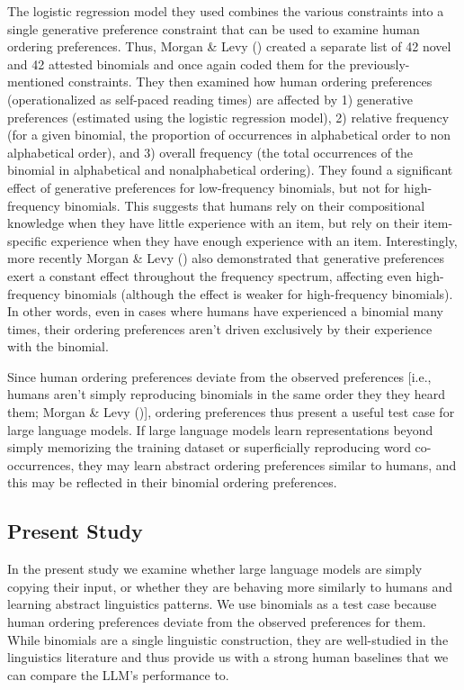 \documentclass[
  12pt,
  letterpaper,
]{scrreprt}
\begin{document}
The logistic regression model they used combines the various constraints
into a single generative preference constraint that can be used to
examine human ordering preferences. Thus, Morgan \& Levy
() created a
separate list of 42 novel and 42 attested binomials and once again coded
them for the previously-mentioned constraints. They then examined how
human ordering preferences (operationalized as self-paced reading times)
are affected by 1) generative preferences (estimated using the logistic
regression model), 2) relative frequency (for a given binomial, the
proportion of occurrences in alphabetical order to non alphabetical
order), and 3) overall frequency (the total occurrences of the binomial
in alphabetical and nonalphabetical ordering). They found a significant
effect of generative preferences for low-frequency binomials, but not
for high-frequency binomials. This suggests that humans rely on their
compositional knowledge when they have little experience with an item,
but rely on their item-specific experience when they have enough
experience with an item. Interestingly, more recently Morgan \& Levy
() also demonstrated that generative
preferences exert a constant effect throughout the frequency spectrum,
affecting even high-frequency binomials (although the effect is weaker
for high-frequency binomials). In other words, even in cases where
humans have experienced a binomial many times, their ordering
preferences aren't driven exclusively by their experience with the
binomial.

Since human ordering preferences deviate from the observed preferences
{[}i.e., humans aren't simply reproducing binomials in the same order
they they heard them; Morgan \& Levy
(){]}, ordering preferences thus present
a useful test case for large language models. If large language models
learn representations beyond simply memorizing the training dataset or
superficially reproducing word co-occurrences, they may learn abstract
ordering preferences similar to humans, and this may be reflected in
their binomial ordering preferences.

\subsection{Present Study}\label{present-study-1}

In the present study we examine whether large language models are simply
copying their input, or whether they are behaving more similarly to
humans and learning abstract linguistics patterns. We use binomials as a
test case because human ordering preferences deviate from the observed
preferences for them. While binomials are a single linguistic
construction, they are well-studied in the linguistics literature and
thus provide us with a strong human baselines that we can compare the
LLM's performance to.
\end{document}
